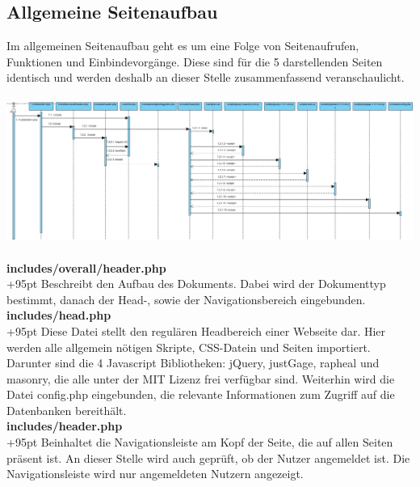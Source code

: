 \documentclass[fontsize = 12pt, paper = a4]{scrreprt}
\begin{document}
\newpage



\subsection{Allgemeine Seitenaufbau}
Im allgemeinen Seitenaufbau geht es um eine Folge von Seitenaufrufen, Funktionen und Einbindevorgänge. Diese sind für die 5 darstellenden Seiten identisch und werden deshalb an dieser Stelle zusammenfassend veranschaulicht.
\\ \\
\includegraphics[scale=0.327]{allgemeineSeitenaufbau.png}
\\ \\

\textbf{includes/overall/header.php}\\
\hangindent+95pt 
Beschreibt den Aufbau des Dokuments. Dabei wird der Dokumenttyp bestimmt, danach der Head-, sowie der Navigationsbereich eingebunden.\\


\textbf{includes/head.php}\\
\hangindent+95pt 
Diese Datei stellt den regulären Headbereich einer Webseite dar. Hier werden alle allgemein nötigen Skripte, CSS-Datein und Seiten importiert. Darunter sind die 4 Javascript Bibliotheken: jQuery, justGage, rapheal und masonry, die alle unter der MIT Lizenz frei verfügbar sind. Weiterhin wird die Datei config.php eingebunden, die relevante Informationen zum Zugriff auf die Datenbanken bereithält.\\


\textbf{includes/header.php}\\
\hangindent+95pt 
Beinhaltet die Navigationsleiste am Kopf der Seite, die auf allen Seiten präsent ist. An dieser Stelle wird auch geprüft, ob der Nutzer angemeldet ist. Die Navigationsleiste wird nur angemeldeten Nutzern angezeigt.
\end{document}
